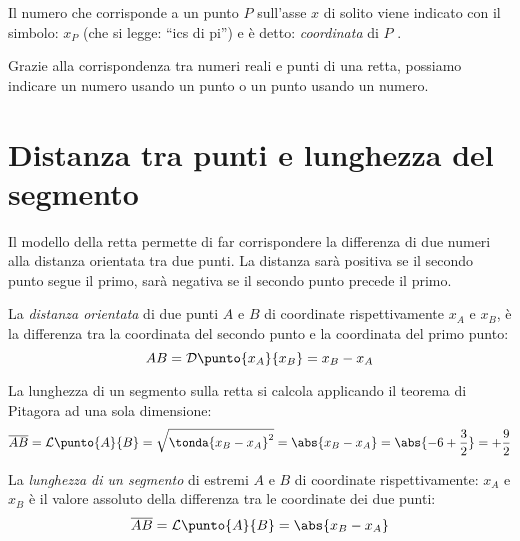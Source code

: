\vspace{.5em}
Il numero che corrisponde a un punto \(P\) sull'asse \(x\) 
di solito viene indicato con il simbolo: \(x_P\) (che si legge: 
``ics di pi'') e è detto: \emph{coordinata} di \(P\) .

Grazie alla corrispondenza tra numeri reali e punti di una retta, 
possiamo indicare un numero usando un punto o un punto usando un numero.

\section{Distanza tra punti e lunghezza del segmento}
\label{sec:topologiadistanza}

\newcommand{\dist}[2]{\mathcal{D}\punto{#1}{#2}}
\newcommand{\lung}[2]{\mathcal{L}\punto{#1}{#2}}
\newcommand{\retta}{\mathcal{R}}

Il modello della retta permette di far corrispondere la differenza di due 
numeri alla distanza orientata tra due punti. 
La distanza sarà positiva se il secondo punto segue il primo, sarà negativa 
se il secondo punto precede il primo.

\begin{newdef}{}{}
La \emph{distanza orientata} di due punti \(A\) e \(B\) di coordinate 
rispettivamente \(x_A\) e \(x_B\), 
è la differenza tra la coordinata del secondo punto e la 
coordinata del primo punto: 
\[AB = \dist{x_A}{x_B} = x_B -x_A\]
\end{newdef}

\vspace{.5em}

La lunghezza di un segmento sulla retta si calcola applicando il teorema di 
Pitagora ad una sola dimensione:
\[\overline{AB} = \lung{A}{B} = \sqrt{\tonda{x_B - x_A}^2} = 
  \abs{x_B - x_A} = \abs{-6 + \dfrac{3}{2}} = +\dfrac{9}{2}\]

\begin{newdef}{}{}
La \emph{lunghezza di un segmento} di estremi \(A\) e \(B\) di coordinate 
rispettivamente:
\(x_A\) e \(x_B\) è il valore assoluto della differenza tra le coordinate 
dei due punti: 
\[\overline{AB} = \lung{A}{B} = \abs{x_B -x_A}\]
\end{newdef}


